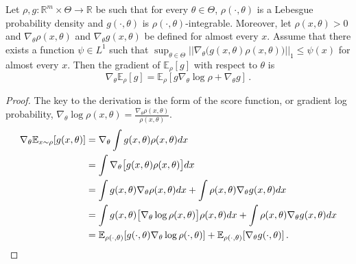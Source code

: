 \documentclass[10pt,a4paper]{amsart}
\begin{document}
\begin{lemma}
\label{lem:scorefunc}
Let $\rho,g:\mathbb{R}^m\times\Theta\to\mathbb{R}$ be such that for every $\theta\in\Theta$, $\rho(\cdot,\theta)$ is a Lebesgue probability density and $g(\cdot,\theta)$ is $\rho(\cdot,\theta)$-integrable. Moreover, let $\rho(x, \theta) > 0$ and $\nabla_\theta \rho(x,\theta)$ and $\nabla_\theta g(x,\theta)$ be defined for almost every $x$. Assume that there exists a function $\psi \in L^1$ such that $\sup_{\theta \in \Theta} || \nabla_\theta \big( g(x, \theta) \rho(x, \theta) \big)||_1 \leq \psi(x)$ for almost every $x$. Then the gradient of $\mathbb{E}_{\rho}[g]$ with respect to $\theta$ is 
    \begin{equation}
        \label{eq:scorefuncest}
        \nabla_\theta \mathbb{E}_{\rho}[g] = \mathbb{E}_{\rho} [ g \nabla_\theta \log \rho + \nabla_\theta g] \, .
    \end{equation}
\end{lemma}

\begin{proof}
    The key to the derivation is the form of the score function, or gradient log probability, $\nabla_\theta \log \rho(x, \theta) = \frac{\nabla_\theta \rho(x, \theta)}{\rho(x, \theta)}$. 
    \begin{align*}
            \nabla_\theta \mathbb{E}_{x \sim \rho}[g(x, \theta)] & = \nabla_\theta \int g(x, \theta) \rho(x, \theta) \textup{d}x 
            \\
            & = \int \nabla_\theta \big[ g(x, \theta) \rho(x, \theta) \big] \textup{d}x
            \\
            & = \int g(x, \theta) \nabla_\theta \rho(x, \theta) \textup{d}x + \int \rho(x, \theta) \nabla_\theta g(x, \theta) \textup{d}x 
            \\
            & = \int g(x, \theta) \big[ \nabla_\theta \log \rho(x, \theta) \big] \rho(x, \theta) \textup{d}x + \int \rho(x, \theta) \nabla_\theta g(x, \theta) \textup{d}x 
            \\
            & = \mathbb{E}_{\rho(\cdot,\theta)} [ g(\cdot,\theta) \nabla_\theta \log \rho(\cdot,\theta)] + \mathbb{E}_{\rho(\cdot,\theta)} [\nabla_\theta g(\cdot,\theta)] \, . 
    \end{align*}

\end{proof}
\end{document}
